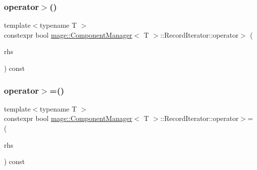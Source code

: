 \subsubsection{\texorpdfstring{operator$>$()}{operator>()}}
{\footnotesize\ttfamily template$<$typename T $>$ \\
constexpr bool \mbox{\hyperlink{classmage_1_1_component_manager}{mage\+::\+Component\+Manager}}$<$ T $>$\+::Record\+Iterator\+::operator$>$ (\begin{DoxyParamCaption}\item[{const \mbox{\hyperlink{classmage_1_1_component_manager_1_1_record_iterator}{Record\+Iterator}} \&}]{rhs }\end{DoxyParamCaption}) const\hspace{0.3cm}{\ttfamily [noexcept]}}

\mbox{\label{classmage_1_1_component_manager_1_1_record_iterator_aff3cf2b140dd247425ebc84de18dbd24}} 
\subsubsection{\texorpdfstring{operator$>$=()}{operator>=()}}
{\footnotesize\ttfamily template$<$typename T $>$ \\
constexpr bool \mbox{\hyperlink{classmage_1_1_component_manager}{mage\+::\+Component\+Manager}}$<$ T $>$\+::Record\+Iterator\+::operator$>$= (\begin{DoxyParamCaption}\item[{const \mbox{\hyperlink{classmage_1_1_component_manager_1_1_record_iterator}{Record\+Iterator}} \&}]{rhs }\end{DoxyParamCaption}) const\hspace{0.3cm}{\ttfamily [noexcept]}}

\mbox{\label{classmage_1_1_component_manager_1_1_record_iterator_ad91604897a2195397cee55a702e8da46}} 
